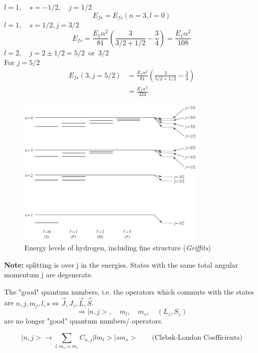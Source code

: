 \documentclass[12pt,fancychapters]{report}
\numberwithin{equation}{section}
\begin{document}
$l=1, \quad s= -1/2, \quad j=1/2$
\[
  E_{fs} = E_{fs}(n=3, l=0)
\]
$l=1,\quad s = 1/2, j = 3/2$
\[
  E_{fs}= \frac{E_1\alpha^2}{81}\left(\frac{3}{3/2+1/2} -\frac{3}{4} \right) =
  \frac{E_1\alpha^2}{108}
\]
$l=2,\quad j=2\pm 1/2 = 5/2\,\,\,\text{or}\,\,\,3/2$\\
For $j=5/2$
\begin{align*}
  E_{fs}(3, j=5/2) &= \frac{E_1\alpha^2}{81}\left(\frac{3}{5/2+1/2}-\frac{3}{4}\right)\\
                   &= \frac{E_1\alpha^2}{324}
\end{align*}
\begin{figure}[H]
  \centering
  \includegraphics[width=0.8\textwidth]{../Figures/FSE.png}
  \caption{Energy levels of hydrogen, including fine structure (\emph{Griffits})}
\end{figure}
\noindent
\textbf{Note:} splitting is over j in the energies. States with the same total angular momentum 
j are degenerate.

The "good" quantum numbers, i.e. the operators which commute with the states are 
$n, j, m_j, l,s \Longleftrightarrow  \vec{J},J_z, \vec{L}, \vec{S}$.
\[
\Rightarrow \big|n,j\big>, \quad m_l, \quad m_s , \quad (L_z, S_z)
\]
are no longer "good" quantum numbers/ operators.

\[
  \big|n,j\big> \longrightarrow \sum_{l,m_s,s,m_s} C_{n,j}\big|lm_l\big>\big|sm_s\big>\qquad
  \text{(Clebsk-London Coefficients)}
\]
\end{document}
